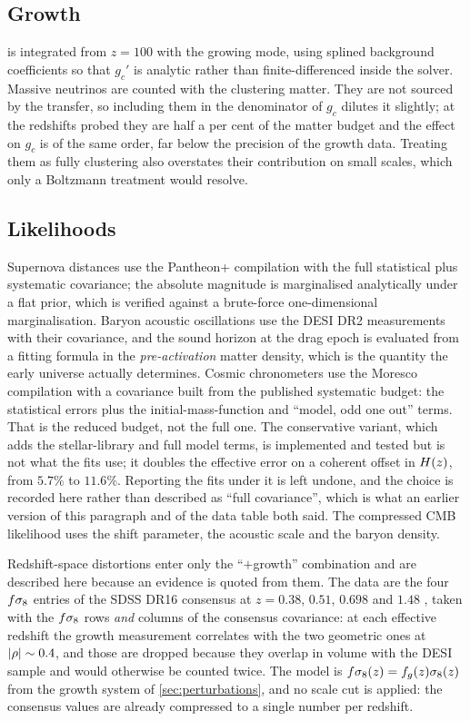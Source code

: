 \subsection{Growth}\label{app:numerics-growth}

 is integrated from $z=100$ with the growing
mode, using splined background coefficients so that $g_c'$ is analytic rather
than finite-differenced inside the solver. Massive neutrinos are counted with
the clustering matter. They are not sourced by the transfer, so including them
in the denominator of $g_c$ dilutes it slightly; at the redshifts probed they
are half a per cent of the matter budget and the effect on $g_c$ is of the same
order, far below the precision of the growth data. Treating them as fully
clustering also overstates their contribution on small scales, which only a
Boltzmann treatment would resolve.

\subsection{Likelihoods}\label{app:numerics-likelihoods}

Supernova distances use the Pantheon+ compilation with the full statistical
plus systematic covariance; the absolute magnitude is marginalised analytically
under a flat prior, which is verified against a brute-force one-dimensional
marginalisation. Baryon acoustic oscillations use the DESI DR2 measurements
with their covariance, and the sound horizon at the drag epoch is evaluated
from a fitting formula in the \emph{pre-activation} matter density, which is
the quantity the early universe actually determines. Cosmic chronometers use the Moresco
compilation with a covariance built from the published systematic budget: the
statistical errors plus the initial-mass-function and ``model, odd one out''
terms. That is the reduced budget, not the full one. The conservative variant,
which adds the stellar-library and full model terms, is implemented and tested
but is not what the fits use; it doubles the effective error on a coherent
offset in $H(z)$, from $5.7\%$ to $11.6\%$. Reporting the fits under it is
left undone, and the choice is recorded here rather than described as ``full
covariance'', which is what an earlier version of this paragraph and of the
data table both said. The compressed CMB likelihood uses the shift parameter, the
acoustic scale and the baryon density.

Redshift-space distortions enter only the ``$+$growth'' combination and are
described here because an evidence is quoted from them. The data are the four
$f\sigma_{8}$ entries of the SDSS DR16 consensus at $z=0.38$, $0.51$, $0.698$ and
$1.48$ \parencite{alam2021_eboss}, taken with the $f\sigma_{8}$ rows \emph{and}
columns of the consensus covariance: at each effective redshift the growth
measurement correlates with the two geometric ones at $\left|\rho\right|\sim0.4$, and
those are dropped because they overlap in volume with the DESI sample and
would otherwise be counted twice. The model is
$f\sigma_{8}(z)=f_g(z)\sigma_8(z)$ from the growth system of
\cref{sec:perturbations}, and no scale cut is applied: the consensus values
are already compressed to a single number per redshift.

